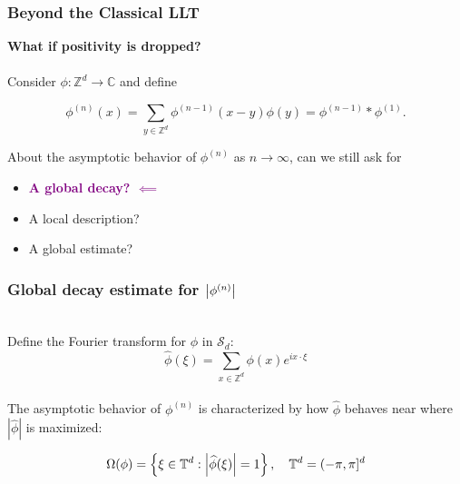 \documentclass{beamer}
\theoremstyle{definition}
\begin{document}


\begin{frame}
\frametitle{Beyond the Classical LLT}
\textbf{What if positivity is dropped?}\\
$\,$\\

Consider $\phi: \mathbb{Z}^d \to \mathbb{C}$ and define 

\begin{equation*}
\phi^{(n)}(x)=\sum_{y\in\mathbb{Z}^d}\phi^{(n-1)}(x-y)\phi(y) = \phi^{(n-1)}\ast \phi^{(1)}.
\end{equation*}

%


About the asymptotic behavior of $\phi^{(n)}$ as $n\to \infty$, can we still ask for
\begin{itemize}
	\item \textcolor{purple}{\textbf{A global decay? $\impliedby$}} 
	\item A local description?
	\item A global estimate?
\end{itemize}



\pause

\centering{\textbf{\textcolor{purple}{HOW?}}}


\end{frame}







\begin{frame}
\frametitle{Global decay estimate for $\abs{\phi^{(n)}}$}



\begin{center}
\end{center}
$\,$\\


Define the Fourier transform for $\phi$ in $\mathcal{S}_d$:
\begin{equation*}
\widehat{\phi}(\xi)=\sum_{x\in\mathbb{Z}^d}\phi(x)e^{ix\cdot\xi}
\end{equation*}
$\,$\\
The asymptotic behavior of $\phi^{(n)}$ is characterized by how $\widehat{\phi}$ behaves near where $|\widehat{\phi}|$ is maximized:

\begin{equation*}
\Omega(\phi)=\left\{\xi\in \mathbb{T}^d:\abs{\widehat{\phi}(\xi)}=1\right\}, \quad \mathbb{T}^d=(-\pi,\pi]^d
\end{equation*}


\end{frame}
\end{document}
